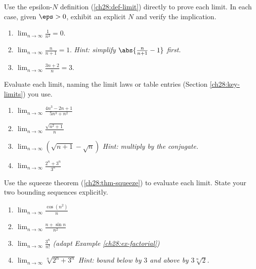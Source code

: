 \begin{exercise}
\label{ch28:exr-epsilonN}
Use the epsilon-$N$ definition (\ref{ch28:def-limit}) directly to prove each
limit. In each case, given $\eps > 0$, exhibit an explicit $N$ and verify the
implication.
\begin{enumerate}[label=(\alph*)]
  \item $\displaystyle\lim_{n\to\infty} \frac{1}{n^2} = 0$.
  \item $\displaystyle\lim_{n\to\infty} \frac{n}{n+1} = 1$.
        \emph{Hint: simplify $\abs{\tfrac{n}{n+1} - 1}$ first.}
  \item $\displaystyle\lim_{n\to\infty} \frac{3n + 2}{n} = 3$.
\end{enumerate}
\end{exercise}

\begin{exercise}
\label{ch28:exr-laws}
Evaluate each limit, naming the limit laws or table entries
(Section \ref{ch28:key-limits}) you use.
\begin{enumerate}[label=(\alph*)]
  \item $\displaystyle\lim_{n\to\infty} \frac{4n^3 - 2n + 1}{5n^3 + n^2}$
  \item $\displaystyle\lim_{n\to\infty} \frac{\sqrt{n^2 + 1}}{n}$
  \item $\displaystyle\lim_{n\to\infty} \left(\sqrt{n+1} - \sqrt{n}\right)$
        \emph{Hint: multiply by the conjugate.}
  \item $\displaystyle\lim_{n\to\infty} \frac{2^n + 3^n}{3^n}$
\end{enumerate}
\end{exercise}

\begin{exercise}
\label{ch28:exr-squeeze}
Use the squeeze theorem (\ref{ch28:thm-squeeze}) to evaluate each limit. State
your two bounding sequences explicitly.
\begin{enumerate}[label=(\alph*)]
  \item $\displaystyle\lim_{n\to\infty} \frac{\cos(n^2)}{n}$
  \item $\displaystyle\lim_{n\to\infty} \frac{n + \sin n}{n^2}$
  \item $\displaystyle\lim_{n\to\infty} \frac{3^n}{n!}$ \emph{(adapt Example
        \ref{ch28:ex-factorial})}
  \item $\displaystyle\lim_{n\to\infty} \sqrt[n]{2^n + 3^n}$
        \emph{Hint: bound below by $3$ and above by $3\sqrt[n]{2}$.}
\end{enumerate}
\end{exercise}

